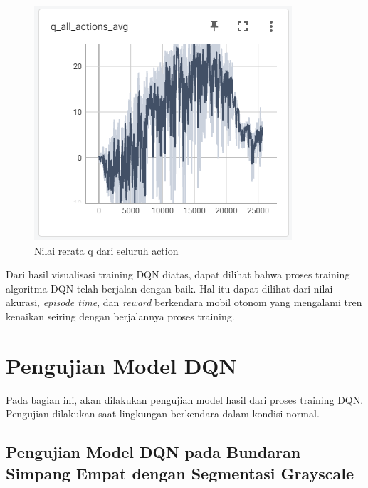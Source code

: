 \begin{figure}[H] 
	\centering
	\includegraphics[width=.7\linewidth]{images/q_all_actions_avg}
	\caption{Nilai rerata q dari seluruh action}
	\label{fig:q_all_actions_avg}
\end{figure}

Dari hasil visualisasi training DQN diatas, dapat dilihat bahwa proses training algoritma DQN telah berjalan dengan baik. Hal itu dapat dilihat dari nilai akurasi, \textit{episode time}, dan \textit{reward} berkendara mobil otonom yang mengalami tren kenaikan seiring dengan berjalannya proses training.

\fi

\section{Pengujian Model DQN}
\label{sec:pengujian_model_dqn}

Pada bagian ini, akan dilakukan pengujian model hasil dari proses training DQN. Pengujian dilakukan saat lingkungan berkendara dalam kondisi normal.

\subsection{Pengujian Model DQN pada Bundaran Simpang Empat dengan Segmentasi Grayscale}
\label{sec:pengujian_dqn_bundaran_simpangempat_segmentasi_grayscale}

